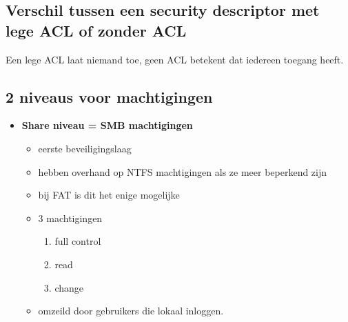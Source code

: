 \subsection{Verschil tussen een security descriptor met lege ACL of zonder ACL}
Een lege ACL laat niemand toe, geen ACL betekent dat iedereen toegang heeft.

\subsection{2 niveaus voor machtigingen}
\begin{itemize}
\item \textbf{Share niveau = SMB machtigingen}
\begin{itemize}
\item eerste beveiligingslaag
\item hebben overhand op NTFS machtigingen als ze meer beperkend zijn
\item bij FAT is dit het enige mogelijke 
\item 3 machtigingen
\begin{enumerate}
\item full control
\item read
\item change
\end{enumerate}
\item omzeild door gebruikers die lokaal inloggen.
\end{itemize}


\end{itemize}
